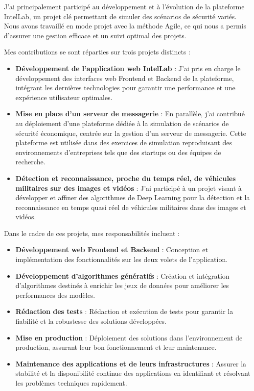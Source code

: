 J'ai principalement participé au développement et à l'évolution de la plateforme IntelLab, un projet clé permettant de simuler des scénarios de sécurité variés.
Nous avons travaillé en mode projet avec la méthode Agile, ce qui nous a permis d'assurer une gestion efficace et un suivi optimal des projets.

\noindent Mes contributions se sont réparties sur trois projets distincts :

\begin{itemize}\addtolength{\itemsep}{-0.35\baselineskip}%
  \item \textbf{Développement de l'application web IntelLab }: J'ai pris en charge le développement des interfaces web Frontend et Backend de la plateforme, intégrant les dernières technologies pour garantir une performance et une expérience utilisateur optimales.
  \item \textbf{Mise en place d'un serveur de messagerie} : En parallèle, j'ai contribué au déploiement d'une plateforme dédiée à la simulation de scénarios de sécurité économique, centrée sur la gestion d'un serveur de messagerie. Cette plateforme est utilisée dans des exercices de simulation reproduisant des environnements d'entreprises tels que des startups ou des équipes de recherche.
  \item \textbf{Détection et reconnaissance, proche du temps réel, de véhicules militaires sur des images et vidéos} : J'ai participé à un projet visant à développer et affiner des algorithmes de Deep Learning pour la détection et la reconnaissance en temps quasi réel de véhicules militaires dans des images et vidéos.
\end{itemize}

\noindent Dans le cadre de ces projets, mes responsabilités incluent :

\begin{itemize}\addtolength{\itemsep}{-0.35\baselineskip}%
  \item \textbf{Développement web Frontend et Backend} : Conception et implémentation des fonctionnalités sur les deux volets de l'application.
  \item \textbf{Développement d'algorithmes génératifs} : Création et intégration d'algorithmes destinés à enrichir les jeux de données pour améliorer les performances des modèles.
  \item \textbf{Rédaction des tests} : Rédaction et exécution de tests pour garantir la fiabilité et la robustesse des solutions développées.
  \item \textbf{Mise en production} : Déploiement des solutions dans l'environnement de production, assurant leur bon fonctionnement et leur maintenance.
  \item \textbf{Maintenance des applications et de leurs infrastructures} : Assurer la stabilité et la disponibilité continue des applications en identifiant et résolvant les problèmes techniques rapidement.
\end{itemize}

